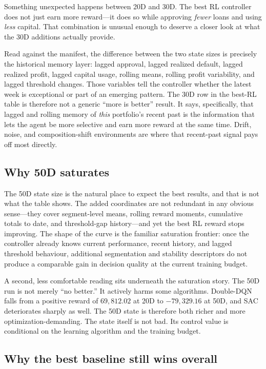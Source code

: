 \documentclass[12pt,a4paper]{article}
\begin{document}
Something unexpected happens between 20D and 30D. The best RL controller does not just earn more reward---it does so while approving \emph{fewer} loans and using \emph{less} capital. That combination is unusual enough to deserve a closer look at what the 30D additions actually provide.

Read against the manifest, the difference between the two state sizes is precisely the historical memory layer: lagged approval, lagged realized default, lagged realized profit, lagged capital usage, rolling means, rolling profit variability, and lagged threshold changes. Those variables tell the controller whether the latest week is exceptional or part of an emerging pattern. The 30D row in the best-RL table is therefore not a generic ``more is better'' result. It says, specifically, that lagged and rolling memory of \emph{this} portfolio's recent past is the information that lets the agent be more selective and earn more reward at the same time. Drift, noise, and composition-shift environments are where that recent-past signal pays off most directly.

\subsection{Why 50D saturates}

The 50D state size is the natural place to expect the best results, and that is not what the table shows. The added coordinates are not redundant in any obvious sense---they cover segment-level means, rolling reward moments, cumulative totals to date, and threshold-gap history---and yet the best RL reward stops improving. The shape of the curve is the familiar saturation frontier: once the controller already knows current performance, recent history, and lagged threshold behaviour, additional segmentation and stability descriptors do not produce a comparable gain in decision quality at the current training budget.

A second, less comfortable reading sits underneath the saturation story. The 50D run is not merely ``no better.'' It actively harms some algorithms. Double-DQN falls from a positive reward of $69{,}812.02$ at 20D to $-79{,}329.16$ at 50D, and SAC deteriorates sharply as well. The 50D state is therefore both richer and more optimization-demanding. The state itself is not bad. Its control value is conditional on the learning algorithm and the training budget.

\subsection{Why the best baseline still wins overall}
\end{document}
